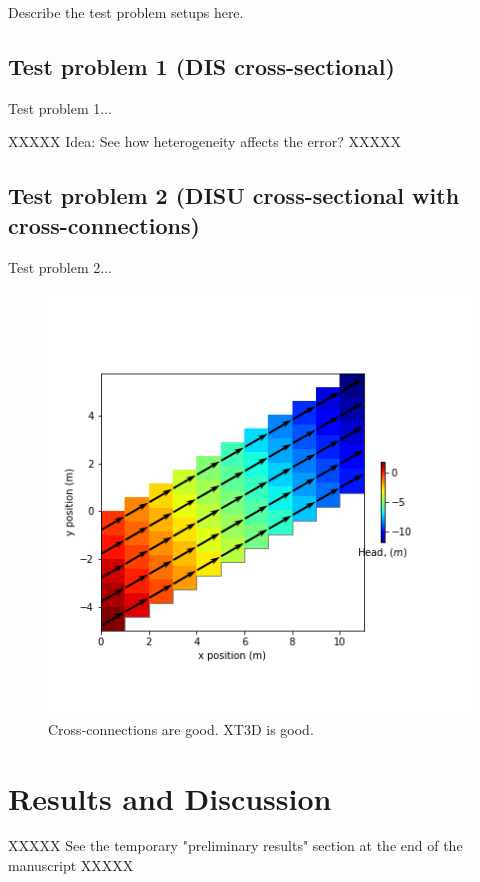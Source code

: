 \documentclass{article}
\begin{document}
Describe the test problem setups here.

\subsection{Test problem 1 (DIS cross-sectional)}

Test problem 1...

XXXXX Idea: See how heterogeneity affects the error? XXXXX

\subsection{Test problem 2 (DISU cross-sectional with cross-connections)}

Test problem 2...

\begin{figure}[H]
	\begin{center}
	\includegraphics[scale=0.5]{../figures/disu-x-cc-head.png}
	\caption{Cross-connections are good. XT3D is good.}
	\label{fig:mymodel-head}
	\end{center}
\end{figure}

\section{Results and Discussion}

XXXXX See the temporary "preliminary results" section at the end of the manuscript XXXXX
\end{document}
